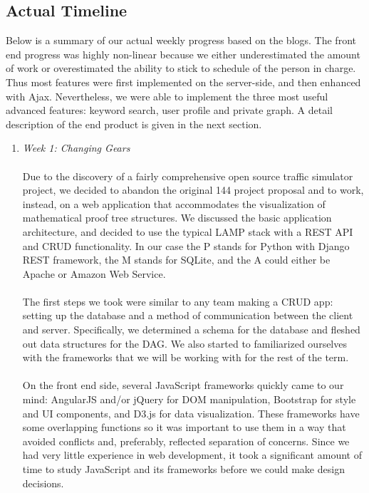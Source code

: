 \documentclass{acm_proc_article-sp}
\begin{document}
\subsection{Actual Timeline}
Below is a summary of our actual weekly progress based on the blogs. The front end progress was highly non-linear because we either underestimated the amount of work or overestimated the ability to stick to schedule of the person in charge. Thus most features were first implemented on the server-side, and then enhanced with Ajax. Nevertheless, we were able to implement the three most useful advanced features: keyword search, user profile and private graph. A detail description of the end product is given in the next section.
\begin{enumerate}
\item \emph{Week 1: Changing Gears}\\\\
Due to the discovery of a fairly comprehensive open source traffic simulator project, we decided to abandon the original 144 project proposal and to work, instead, on a web application that accommodates the visualization of mathematical proof tree structures. We discussed the basic application architecture, and decided to use the typical LAMP stack with a REST API and CRUD functionality. In our case the P stands for Python with Django REST framework, the M stands for SQLite, and the A could either be Apache or Amazon Web Service.\\\\
The first steps we took were similar to any team making a CRUD app: setting up the database and a method of communication between the client and server. Specifically, we determined a schema for the database and fleshed out data structures for the DAG. We also started to familiarized ourselves with the frameworks that we will be working with for the rest of the term.\\\\
On the front end side, several JavaScript frameworks quickly came to our mind:
AngularJS\cite{Google:2014:Online} and/or jQuery for DOM manipulation, Bootstrap\cite{UI:2014:Online} for style and UI components, and D3.js \cite{Bostock:2014:Online} for data visualization. These frameworks have some overlapping functions so it was important to use them in a way that avoided conflicts and, preferably, reflected separation of concerns. Since we had  very little experience in web development, it took a significant amount of time to study JavaScript and its frameworks before we could make design decisions.\\\\


\end{enumerate}
\end{document}

